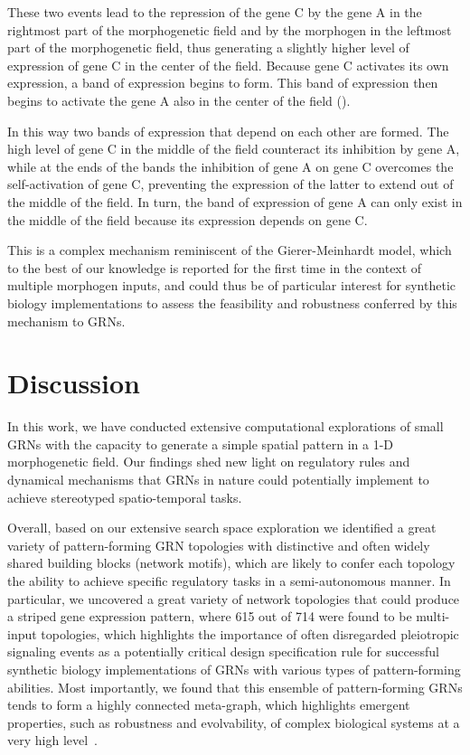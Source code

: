 \documentclass[10pt,letterpaper]{article}
\begin{document}
These two events lead to the repression of the gene C by the gene A in the
rightmost part of the morphogenetic field and by the morphogen in the leftmost
part of the morphogenetic field, thus generating a slightly higher level of
expression of gene C in the center of the field. Because gene C activates its
own expression, a band of expression begins to form. This band of expression
then begins to activate the gene A also in the center of the field
().

In this way two bands of expression that depend on each other are formed. The
high level of gene C in the middle of the field counteract its inhibition by
gene A, while at the ends of the bands the inhibition of gene A on gene C
overcomes the self-activation of gene C, preventing the expression of the
latter to extend out of the middle of the field. In turn, the band of
expression of gene A can only exist in the middle of the field because its
expression depends on gene C.

This is a complex mechanism reminiscent of the Gierer-Meinhardt model, which
to the best of our knowledge is reported for the first time in the context of
multiple morphogen inputs, and could thus be of particular interest for
synthetic biology implementations to assess the feasibility and robustness
conferred by this mechanism to GRNs.

\section*{Discussion}

In this work, we have conducted extensive computational explorations of small
GRNs with the capacity to generate a simple spatial pattern in a 1-D
morphogenetic field. Our findings shed new light on regulatory rules and
dynamical mechanisms that GRNs in nature could potentially implement to
achieve stereotyped spatio-temporal tasks.

Overall, based on our extensive search space exploration we identified
a great variety of pattern-forming GRN topologies  with distinctive and often
widely shared building blocks (network motifs), which are likely to confer
each topology the ability to achieve specific regulatory tasks in a semi-autonomous
manner. In particular, we uncovered a great variety of network
topologies that could produce a striped gene expression pattern, where 615 out of
714 were found to be multi-input topologies, which highlights the importance of
often disregarded pleiotropic signaling events as a potentially critical design
specification rule for successful synthetic biology implementations of GRNs
with various types of pattern-forming abilities. Most importantly, we found that
this ensemble of pattern-forming GRNs
tends to form a highly connected meta-graph, which highlights emergent
properties, such as robustness and evolvability, of complex biological
systems at a very high level~\cite{kitano2004}.\\
\end{document}
